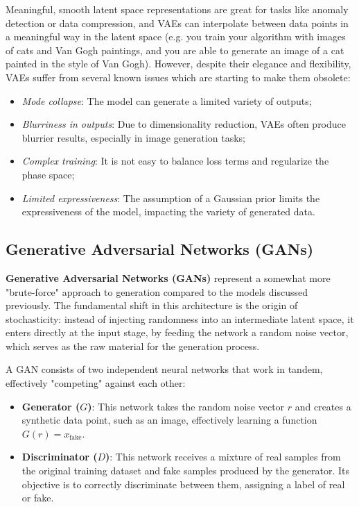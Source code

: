 Meaningful, smooth latent space representations are great for tasks like anomaly detection or data compression, and VAEs can interpolate between data points in a meaningful way in the latent space (e.g. you train your algorithm with images of cats and Van Gogh paintings, and you are able to generate an image of a cat painted in the style of Van Gogh). However, despite their elegance and flexibility, VAEs suffer from several known issues which are starting to make them obsolete:
\begin{itemize}
    \item[-] \textit{Mode collapse}: The model can generate a limited variety of outputs; 
    \item[-] \textit{Blurriness in outputs}: Due to dimensionality reduction, VAEs often produce blurrier results, especially in image generation tasks;
    \item[-] \textit{Complex training}: It is not easy to balance loss terms and regularize the phase space;
    \item[-] \textit{Limited expressiveness}: The assumption of a Gaussian prior limits the expressiveness of the model, impacting the variety of generated data.
\end{itemize}

\subsection{Generative Adversarial Networks (GANs)}\label{sec:intro_GAN}

\textbf{Generative Adversarial Networks (GANs)} represent a somewhat more "brute-force" approach to generation compared to the models discussed previously. The fundamental shift in this architecture is the origin of stochasticity: instead of injecting randomness into an intermediate latent space, it enters directly at the input stage, by feeding the network a random noise vector, which serves as the raw material for the generation process.

A GAN consists of two independent neural networks that work in tandem, effectively "competing" against each other:
\begin{itemize}
    \item[-] \textbf{Generator ($G$)}: This network takes the random noise vector $r$ and creates a synthetic data point, such as an image, effectively learning a function $G(r) = x_{\text{fake}}$. 
    \item[-] \textbf{Discriminator ($D$)}: This network receives a mixture of real samples from the original training dataset and fake samples produced by the generator. Its objective is to correctly discriminate between them, assigning a label of real or fake.
\end{itemize}


